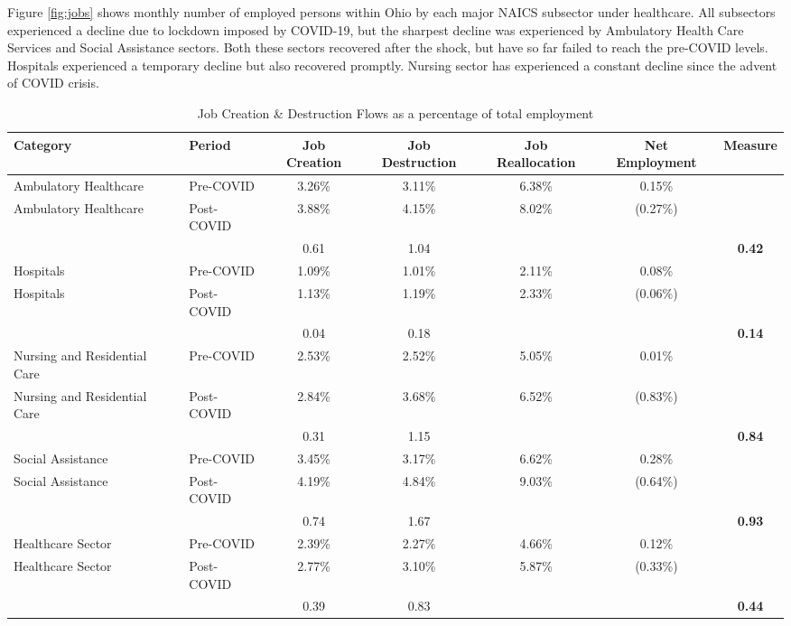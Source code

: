 \documentclass[11pt]{article}
\begin{document}
Figure \ref{fig:jobs} shows monthly number of employed persons within Ohio by each major NAICS subsector under healthcare. All subsectors experienced a decline due to lockdown imposed by COVID-19, but the sharpest decline was experienced by Ambulatory Health Care Services and Social Assistance sectors. Both these sectors recovered after the shock, but have so far failed to reach the pre-COVID levels. Hospitals experienced a temporary decline but also recovered promptly. Nursing sector has experienced a constant decline since the advent of COVID crisis.

\vskip 0.1cm

\begin{table}[h]
\caption{Job Creation \& Destruction Flows as a percentage of total employment}
\resizebox{\textwidth}{!}
{
\begin{tabular}{llccccc}
\hline
\rowcolor[HTML]{C0C0C0} 
Category & Period & Job Creation & Job Destruction & Job Reallocation & Net Employment & Measure  \\ \hline
Ambulatory Healthcare & Pre-COVID & 3.26\% & 3.11\% & 6.38\% & 0.15\%  \\ \hline
Ambulatory Healthcare & Post-COVID & 3.88\% & 4.15\% & 8.02\% & (0.27\%) \\ \hline
 &  & 0.61 & 1.04 &  &  & \textbf{0.42} \\ \hline
Hospitals & Pre-COVID & 1.09\% & 1.01\% & 2.11\% & 0.08\% \\ \hline
Hospitals & Post-COVID & 1.13\% & 1.19\% & 2.33\% & (0.06\%) \\ \hline
 &  & 0.04 & 0.18 &  &  & \textbf{0.14} \\ \hline
Nursing and Residential Care & Pre-COVID & 2.53\% & 2.52\% & 5.05\% & 0.01\% \\ \hline
Nursing and Residential Care & Post-COVID & 2.84\% & 3.68\% & 6.52\% & (0.83\%) \\ \hline
 &  & 0.31 & 1.15 &  &  & \textbf{0.84} \\ \hline
Social Assistance & Pre-COVID & 3.45\% & 3.17\% & 6.62\% & 0.28\% \\ \hline
Social Assistance & Post-COVID & 4.19\% & 4.84\% & 9.03\% & (0.64\%) \\ \hline
 &  & 0.74 & 1.67 &  &  & \textbf{0.93} \\ \hline
Healthcare Sector & Pre-COVID & 2.39\% & 2.27\% & 4.66\% & 0.12\% \\ \hline
Healthcare Sector & Post-COVID & 2.77\% & 3.10\% & 5.87\% & (0.33\%) \\ \hline
 &  & 0.39 & 0.83 &  &  & \textbf{0.44} \\ \hline
\end{tabular}
}
\label{table:ohphscovid}
\end{table}
\vskip 0.2cm
\end{document}
